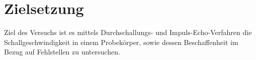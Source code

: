 
\section{Zielsetzung}
\label{sec:Zielsetzung}

Ziel des Versuchs ist es mittels Durchschallungs- und Impuls-Echo-Verfahren die Schallgeschwindigkeit in einem Probekörper, sowie dessen Beschaffenheit im Bezug auf Fehlstellen zu untersuchen.
